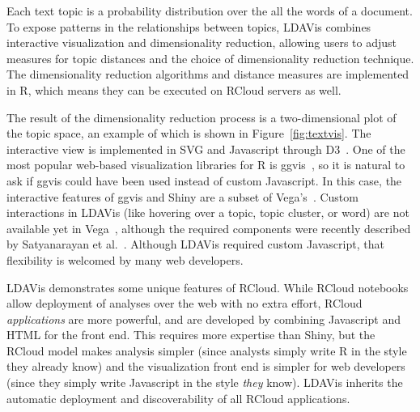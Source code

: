 Each text topic is a probability distribution over the all the
words of a document. To expose patterns in the relationships
between topics, LDAVis combines
interactive visualization and dimensionality reduction,
allowing users to adjust measures for topic distances and the choice
of dimensionality reduction technique. The dimensionality reduction
algorithms and distance measures are implemented in R, which
means they can be executed on RCloud servers as well.

The result of the dimensionality reduction process is a
two-dimensional plot of the topic space, an example of which is shown in
Figure~\ref{fig:textvis}. The interactive view is implemented in SVG
and Javascript through D3~\cite{Bostock:2011:DDD}. One of the most
popular web-based visualization libraries for R is ggvis~\cite{ggvis},
so it is natural to ask if ggvis could have been used instead of
custom Javascript. In this case, the interactive features of ggvis
and Shiny are a subset of Vega's~\cite{vega}.
Custom interactions in LDAVis (like hovering over a topic,
topic cluster, or word) are not available yet in Vega~\cite{vega},
although the required components were recently described by Satyanarayan et
al.~\cite{Satyanarayan:2014:DID}.
Although LDAVis required custom Javascript, that flexibility is welcomed
by many web developers.

LDAVis demonstrates some unique features of RCloud.
While RCloud notebooks allow deployment of analyses over
the web with no extra effort, RCloud \emph{applications} are more
powerful, and are developed by combining Javascript and HTML
for the front end. This requires more expertise than Shiny, but
the RCloud model makes analysis simpler (since analysts
simply write R in the style they already know)
and the visualization front end is simpler for web
developers (since they simply write Javascript in
the style \emph{they} know).
LDAVis inherits the automatic deployment and discoverability
of all RCloud applications.

%
